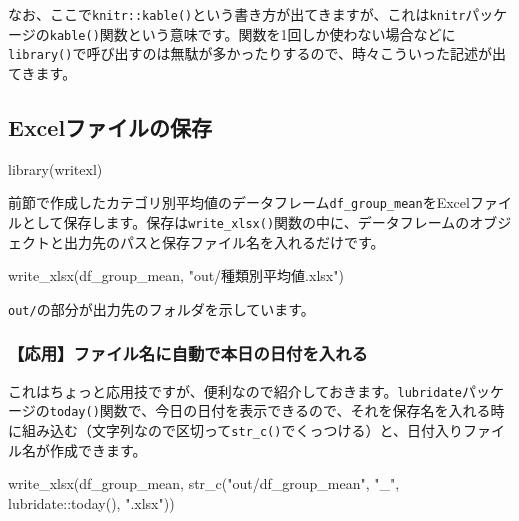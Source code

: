 \documentclass[
  xelatex,ja=standard, b5paper]{bxjsbook}
\newenvironment{Shaded}{\begin{snugshade}}{\end{snugshade}}
\newcommand{\FunctionTok}[1]{\textcolor[rgb]{0.00,0.00,0.00}{#1}}
\newcommand{\NormalTok}[1]{#1}
\newcommand{\SpecialCharTok}[1]{\textcolor[rgb]{0.00,0.00,0.00}{#1}}
\newcommand{\StringTok}[1]{\textcolor[rgb]{0.31,0.60,0.02}{#1}}
\begin{document}
なお、ここで\texttt{knitr::kable()}という書き方が出てきますが、これは\texttt{knitr}パッケージの\texttt{kable()}関数という意味です。関数を1回しか使わない場合などに\texttt{library()}で呼び出すのは無駄が多かったりするので、時々こういった記述が出てきます。

\hypertarget{excelux30d5ux30a1ux30a4ux30ebux306eux4fddux5b58}{%
\subsection{Excelファイルの保存}\label{excelux30d5ux30a1ux30a4ux30ebux306eux4fddux5b58}}

\begin{Shaded}
\begin{Highlighting}[]
\FunctionTok{library}\NormalTok{(writexl)}
\end{Highlighting}
\end{Shaded}

前節で作成したカテゴリ別平均値のデータフレーム\texttt{df\_group\_mean}をExcelファイルとして保存します。保存は\texttt{write\_xlsx()}関数の中に、データフレームのオブジェクトと出力先のパスと保存ファイル名を入れるだけです。

\begin{Shaded}
\begin{Highlighting}[]
\FunctionTok{write\_xlsx}\NormalTok{(df\_group\_mean, }\StringTok{"out/種類別平均値.xlsx"}\NormalTok{)}
\end{Highlighting}
\end{Shaded}

\texttt{out/}の部分が出力先のフォルダを示しています。

\hypertarget{ux5fdcux7528ux30d5ux30a1ux30a4ux30ebux540dux306bux81eaux52d5ux3067ux672cux65e5ux306eux65e5ux4ed8ux3092ux5165ux308cux308b}{%
\subsubsection{【応用】ファイル名に自動で本日の日付を入れる}\label{ux5fdcux7528ux30d5ux30a1ux30a4ux30ebux540dux306bux81eaux52d5ux3067ux672cux65e5ux306eux65e5ux4ed8ux3092ux5165ux308cux308b}}

これはちょっと応用技ですが、便利なので紹介しておきます。\texttt{lubridate}パッケージの\texttt{today()}関数で、今日の日付を表示できるので、それを保存名を入れる時に組み込む（文字列なので区切って\texttt{str\_c()}でくっつける）と、日付入りファイル名が作成できます。

\begin{Shaded}
\begin{Highlighting}[]
\FunctionTok{write\_xlsx}\NormalTok{(df\_group\_mean, }
         \FunctionTok{str\_c}\NormalTok{(}\StringTok{"out/df\_group\_mean"}\NormalTok{, }\StringTok{"\_"}\NormalTok{, lubridate}\SpecialCharTok{::}\FunctionTok{today}\NormalTok{(), }\StringTok{".xlsx"}\NormalTok{))}
\end{Highlighting}
\end{Shaded}
\end{document}
